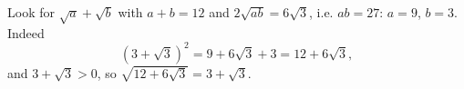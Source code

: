Look for $\sqrt a+\sqrt b$ with $a+b=12$ and $2\sqrt{ab}=6\sqrt3$, i.e. $ab=27$: $a=9$, $b=3$. Indeed
\[\left(3+\sqrt3\right)^2=9+6\sqrt3+3=12+6\sqrt3,\]
and $3+\sqrt3>0$, so $\sqrt{12+6\sqrt3}=\boxed{3+\sqrt3}$.
